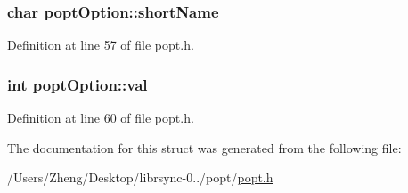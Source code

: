 \hypertarget{structpopt_option_a966cc537f19dfbd443e768a99dec1f23}{}
\subsubsection[{short\+Name}]{\setlength{\rightskip}{0pt plus 5cm}char popt\+Option\+::short\+Name}\label{structpopt_option_a966cc537f19dfbd443e768a99dec1f23}


Definition at line 57 of file popt.\+h.

\hypertarget{structpopt_option_aa6a9c91f5c1869870c3b872395e2b625}{}
\subsubsection[{val}]{\setlength{\rightskip}{0pt plus 5cm}int popt\+Option\+::val}\label{structpopt_option_aa6a9c91f5c1869870c3b872395e2b625}


Definition at line 60 of file popt.\+h.



The documentation for this struct was generated from the following file\+:\begin{DoxyCompactItemize}
\item 
/\+Users/\+Zheng/\+Desktop/librsync-\/0../popt/\hyperlink{popt_8h}{popt.\+h}\end{DoxyCompactItemize}
